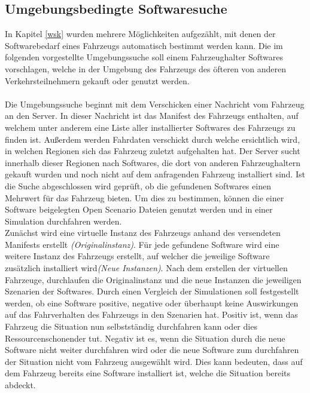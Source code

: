 \subsection{Umgebungsbedingte Softwaresuche}\label{umgebungssuche}
In Kapitel \ref{wsk} wurden mehrere Möglichkeiten aufgezählt, mit denen der Softwarebedarf eines Fahrzeugs automatisch bestimmt werden kann. Die im folgenden vorgestellte Umgebungssuche soll einem Fahrzeughalter Softwares vorschlagen, welche in der Umgebung des Fahrzeugs des öfteren von anderen Verkehrsteilnehmern gekauft oder genutzt werden.\\\\
Die Umgebungssuche beginnt mit dem Verschicken einer Nachricht vom Fahrzeug an den Server. In dieser Nachricht ist das Manifest des Fahrzeugs enthalten, auf welchem unter anderem eine Liste aller installierter Softwares des Fahrzeugs zu finden ist. Außerdem werden Fahrdaten verschickt durch welche ersichtlich wird, in welchen Regionen sich das Fahrzeug zuletzt aufgehalten hat. Der Server sucht innerhalb dieser Regionen nach Softwares, die dort von anderen Fahrzeughaltern gekauft wurden und noch nicht auf dem anfragenden Fahrzeug installiert sind. Ist die Suche abgeschlossen wird geprüft, ob die gefundenen Softwares einen Mehrwert für das Fahrzeug bieten. Um dies zu bestimmen, können die einer Software beigelegten Open Scenario Dateien genutzt werden und in einer Simulation durchfahren werden.\\

Zunächst wird eine virtuelle Instanz des Fahrzeugs anhand des versendeten Manifests erstellt \textit{(Originalinstanz)}. Für jede gefundene Software wird eine weitere Instanz des Fahrzeugs erstellt, auf welcher die jeweilige Software zusätzlich installiert wird\textit{(Neue Instanzen)}. Nach dem erstellen der virtuellen Fahrzeuge, durchlaufen die Originalinstanz und die neue Instanzen die jeweiligen Szenarien der Softwares. Durch einen Vergleich der Simulationen soll festgestellt werden, ob eine Software positive, negative oder überhaupt keine Auswirkungen auf das Fahrverhalten des Fahrzeugs in den Szenarien hat. Positiv ist, wenn das Fahrzeug die Situation nun selbstständig durchfahren kann oder dies Ressourcenschonender tut. Negativ  ist es, wenn die Situation durch die neue Software nicht weiter durchfahren wird oder die neue Software zum durchfahren der Situation nicht vom Fahrzeug ausgewählt wird. Dies kann bedeuten, dass auf dem Fahrzeug bereits eine Software installiert ist, welche die Situation bereits abdeckt.

